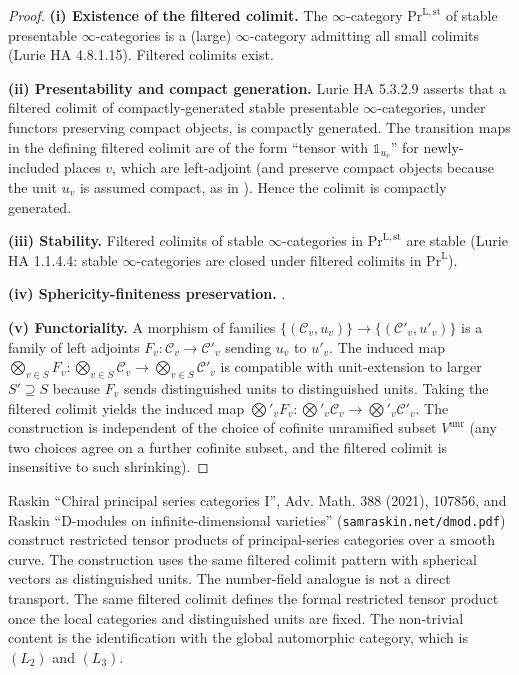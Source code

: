 \begin{proof}
\textbf{(i) Existence of the filtered colimit.} The \(\infty\)-category
\(\mathrm{Pr}^{\mathrm{L,st}}\) of stable presentable \(\infty\)-categories
is a (large) \(\infty\)-category admitting all small colimits (Lurie
HA 4.8.1.15). Filtered colimits exist.

\textbf{(ii) Presentability and compact generation.} Lurie HA
5.3.2.9 asserts that a filtered colimit of compactly-generated
stable presentable \(\infty\)-categories, under functors preserving
compact objects, is compactly generated. The transition maps in the
defining filtered colimit are of the form ``tensor with
\(\mathbb{1}_{u_{v}}\)'' for newly-included places \(v\), which are
left-adjoint (and preserve compact objects because the unit \(u_{v}\)
is assumed compact, as in
). Hence the colimit is
compactly generated.

\textbf{(iii) Stability.} Filtered colimits of stable
\(\infty\)-categories in \(\mathrm{Pr}^{\mathrm{L,st}}\) are stable
(Lurie HA 1.1.4.4: stable \(\infty\)-categories are closed under
filtered colimits in \(\mathrm{Pr}^{\mathrm{L}}\)).

\textbf{(iv) Sphericity-finiteness preservation.}
.

\textbf{(v) Functoriality.} A morphism of families
\(\{(\mathcal{C}_{v}, u_{v})\}\to\{(\mathcal{C}'_{v}, u'_{v})\}\) is a
family of left adjoints \(F_{v}:\mathcal{C}_{v}\to\mathcal{C}'_{v}\)
sending \(u_{v}\) to \(u'_{v}\). The induced map
\(\bigotimes_{v\in S}F_{v}:\bigotimes_{v\in S}\mathcal{C}_{v}\to\bigotimes_{v\in S}\mathcal{C}'_{v}\)
is compatible with unit-extension to larger \(S'\supseteq S\) because
\(F_{v}\) sends distinguished units to distinguished units. Taking the
filtered colimit yields the induced map
\(\bigotimes'_{v}F_{v}:\bigotimes'_{v}\mathcal{C}_{v}\to\bigotimes'_{v}\mathcal{C}'_{v}\).
The construction is independent of the choice of cofinite unramified
subset \(V^{\mathrm{unr}}\) (any two choices agree on a further
cofinite subset, and the filtered colimit is insensitive to such
shrinking).
\end{proof}

\begin{remark}
\label{v4-arith:acd:rem:raskin-comparison}
Raskin ``Chiral principal series categories I'', Adv. Math. 388
(2021), 107856, and Raskin ``D-modules on infinite-dimensional
varieties'' (\texttt{samraskin.net/dmod.pdf}) construct
restricted tensor products of principal-series categories over a
smooth curve. The construction uses the same filtered colimit
pattern with spherical vectors as distinguished units. The
number-field analogue is not a direct transport.  The same filtered
colimit defines the formal restricted tensor product once the local
categories and distinguished units are fixed.  The non-trivial content
is the identification with the global automorphic category, which is
\((L_{2})\) and \((L_{3})\).
\end{remark}

